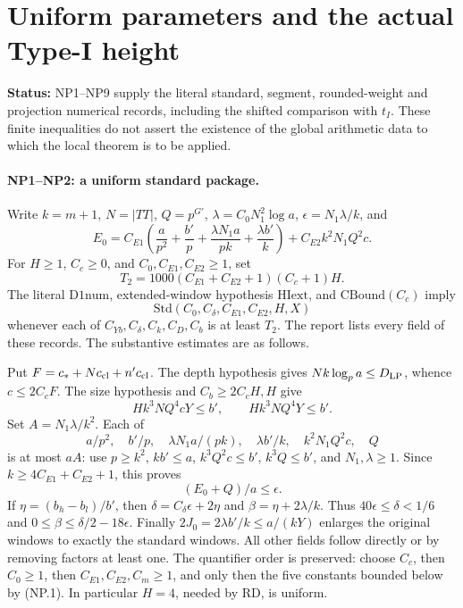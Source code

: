 \documentclass[11pt,a4paper]{article}
\numberwithin{equation}{section}
\theoremstyle{remark}\newtheorem{remark}[theorem]{Remark}
\newcommand{\status}[1]{\textbf{Status:} #1}
\begin{document}
\section{Uniform parameters and the actual Type-I height}
\label{sec:numerical-parameters}

\status{NP1--NP9 supply the literal standard, segment, rounded-weight and
projection numerical records, including the shifted comparison with $t_I$.
These finite inequalities do not assert the existence of the global
arithmetic data to which the local theorem is to be applied.}

\paragraph{NP1--NP2: a uniform standard package.}
Write $k=m+1$, $N=|TT|$, $Q=p^{G'}$, $\lambda=C_0N_1^2\log a$,
$\epsilon=N_1\lambda/k$, and
\[
 E_0=C_{E1}\left(\frac a{p^2}+\frac {b'}p+
              \frac{\lambda N_1a}{pk}+\frac{\lambda b'}k\right)
       +C_{E2}k^2N_1Q^2c.
\]
For $H\ge1$, $C_c\ge0$, and $C_0,C_{E1},C_{E2}\ge1$, set
\[
 T_2=1000(C_{E1}+C_{E2}+1)(C_c+1)H.                 \tag{NP.1}
\]
The literal $\mathrm{D1num}$, extended-window hypothesis $\mathrm{HIext}$,
and $\mathrm{CBound}(C_c)$ imply
\[
                  \mathrm{Std}(C_0,C_\delta,C_{E1},C_{E2},H,X)
\]
whenever
each of $C_{Yb},C_\delta,C_k,C_D,C_b$ is at least $T_2$.
The report lists every field of these records. The substantive estimates
are as follows.

Put $F=c_*+Nc_{\rm cl}+n'c_{\rm cl}$. The depth hypothesis gives
$Nk\log_pa\le D_{\rm LP}$, whence $c\le2C_cF$.
The size hypothesis and $C_b\ge2C_cH,H$ give
\[
 Hk^3NQ^4cY\le b',\qquad Hk^3NQ^4Y\le b'.        \tag{NP.2}
\]
Set $A=N_1\lambda/k^2$. Each of
\[
 a/p^2,\quad b'/p,\quad\lambda N_1a/(pk),\quad
 \lambda b'/k,\quad k^2N_1Q^2c,\quad Q
\]
is at most $aA$: use $p\ge k^2$, $kb'\le a$,
$k^3Q^2c\le b'$, $k^3Q\le b'$, and $N_1,\lambda\ge1$.
Since $k\ge4C_{E1}+C_{E2}+1$, this proves
\[
                         (E_0+Q)/a\le\epsilon.    \tag{NP.3}
\]
If $\eta=(b_h-b_l)/b'$, then
$\delta=C_\delta\epsilon+2\eta$ and
$\beta=\eta+2\lambda/k$. Thus
$40\epsilon\le\delta<1/6$ and
$0\le\beta\le\delta/2-18\epsilon$.
Finally $2J_0=2\lambda b'/k\le a/(kY)$ enlarges the original windows
to exactly the standard windows. All other fields follow directly or
by removing factors at least one.
The quantifier order is preserved: choose $C_c$, then $C_0\ge1$,
then $C_{E1},C_{E2},C_m\ge1$, and only then the five constants
bounded below by (NP.1). In particular $H=4$, needed by RD, is uniform.
\end{document}
